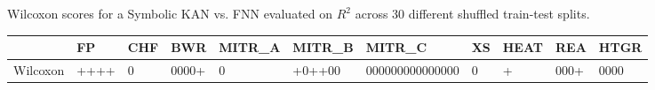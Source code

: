 \caption{Wilcoxon scores for a Symbolic KAN vs. FNN evaluated on $R^2$ across 30 different shuffled train-test splits.}
\begin{tabular}{lllllllllll}
\toprule
 & FP & CHF & BWR & MITR_A & MITR_B & MITR_C & XS & HEAT & REA & HTGR \\
\midrule
Wilcoxon & ++++ & 0 & 0000+ & 0 & +0++00 & 000000000000000 & 0 & + & 000+ & 0000 \\
\bottomrule
\end{tabular}
